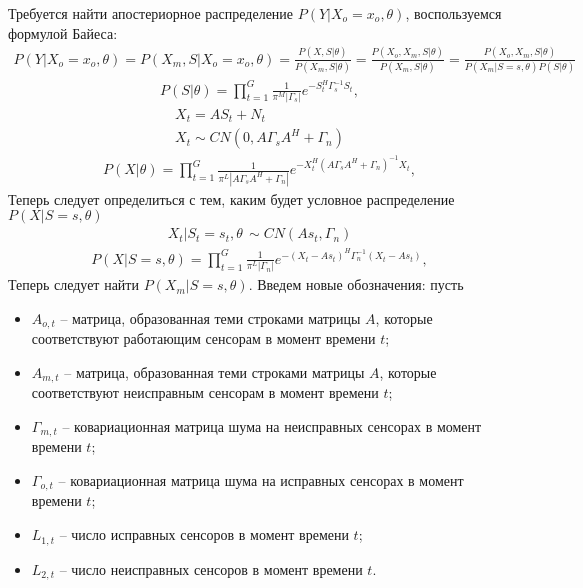 \documentclass[11pt]{article}
\begin{document}
\begin{center}
\fontsize{16}{20}\selectfont {}
\end{center}
Требуется найти апостериорное распределение $P(Y|X_o=x_o,\theta)$, воспользуемся формулой Байеса:
\begin{gather}
P(Y|X_o=x_o,\theta) = P(X_m, S|X_o=x_o,\theta) = \frac{P(X, S|\theta)}{P(X_m, S|\theta)} = \frac{P(X_o, X_m, S|\theta)}{P(X_m, S|\theta)} = \frac{P(X_o, X_m, S|\theta)}{P(X_m|S=s, \theta)P(S|\theta)} 
\end{gather}
\begin{gather}
P(S|\theta) = \prod_{t=1}^G \frac{1}{\pi^M |\Gamma_s|}e^{-S_t^H\Gamma_s^{-1}S_t},
\end{gather}
\begin{gather*}
X_t = AS_t + N_t \\
X_t \sim CN(0, A\Gamma_s A^H + \Gamma_n)
\end{gather*}
\begin{gather}
P(X|\theta) = \prod_{t=1}^G \frac{1}{\pi^L |A\Gamma_s  A^H + \Gamma_n|}e^{-X_t^H (A\Gamma_s A^H + \Gamma_n)^{-1}X_t},
\end{gather}
Теперь следует определиться с тем, каким будет условное распределение $P(X|S=s, \theta)$
\begin{gather*}
X_t|S_t=s_t, \theta \, \sim CN(A s_t, \Gamma_n)
\end{gather*}
\begin{gather}
P(X|S=s,\theta) = \prod_{t=1}^G \frac{1}{\pi^L |\Gamma_n|}e^{-(X_t-A s_t)^H \Gamma_n^{-1}(X_t-A s_t)},
\end{gather}
Теперь следует найти $P(X_m|S=s, \theta)$. Введем новые обозначения: пусть
\begin{itemize}
\item 
$A_{o,t}$ -- матрица, образованная теми строками матрицы $A$, которые соответствуют работающим сенсорам в момент времени $t$; 
\item
$A_{m,t}$ -- матрица, образованная теми строками матрицы $A$, которые соответствуют неисправным сенсорам в момент времени $t$;
\item
$\Gamma_{m,t}$ -- ковариационная матрица шума на неисправных сенсорах в момент времени $t$;
\item 
 $\Gamma_{o,t}$ -- ковариационная матрица шума на исправных сенсорах в момент времени $t$;
\item
$L_{1,t}$ -- число исправных сенсоров в момент времени $t$;
\item
 $L_{2,t}$ -- число неисправных сенсоров в момент времени $t$.
\end{itemize}
\end{document}
